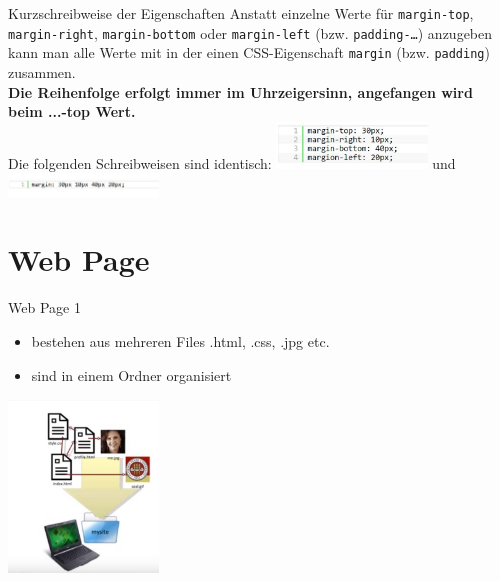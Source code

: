 \documentclass[12pt,xcolor={rgb}]{beamer}
\begin{document}
\begin{frame}{Kurzschreibweise der Eigenschaften}
Anstatt einzelne Werte für \texttt{margin-top}, \texttt{margin-right}, \texttt{margin-bottom} oder \texttt{margin-left} (bzw. \texttt{padding-…}) anzugeben kann man alle Werte mit in der einen CSS-Eigenschaft \texttt{margin} (bzw. \texttt{padding}) zusammen.\\
\textbf{Die Reihenfolge erfolgt immer im Uhrzeigersinn, angefangen wird beim ...-top Wert.}\\
Die folgenden Schreibweisen sind identisch:
\includegraphics[width=4cm]{imgs/css_lang.JPG}
und 
\includegraphics[width=4cm]{imgs/css_kurz.JPG}
\end{frame}


\section{Web Page}

\begin{frame}{Web Page 1}
\begin{itemize}
\item bestehen aus mehreren Files .html, .css, .jpg etc.
\item sind in einem Ordner organisiert
\end{itemize}
\includegraphics[width=4cm]{imgs/web_page.JPG}
\end{frame}
\end{document}
